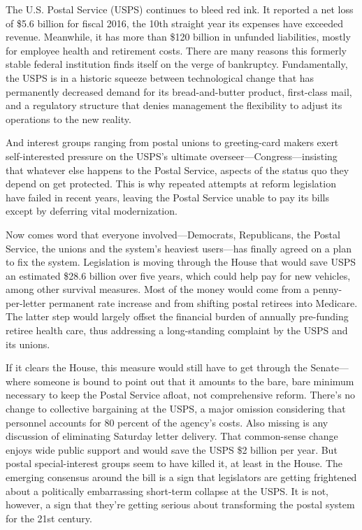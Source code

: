 The U.S. Postal Service (USPS) continues to bleed red ink. It reported
a net loss of \$5.6 billion for fiscal 2016, the 10th
straight year its expenses have exceeded revenue. Meanwhile, it has
more than \$120 billion in unfunded liabilities, mostly for employee
health and retirement costs. There are many reasons this formerly
stable federal institution finds itself on the verge of bankruptcy.
Fundamentally, the USPS is in a historic squeeze between technological
change that has permanently decreased demand for its bread-and-butter
product, first-class mail, and a regulatory structure that denies
management the flexibility to adjust its operations to the new reality.

And interest groups ranging from postal unions to greeting-card makers
exert self-interested pressure on the USPS's ultimate
overseer---Congress---insisting that whatever else happens to the Postal
Service, aspects of the status quo they depend on get protected. This
is why repeated attempts at reform legislation have failed in recent
years, leaving the Postal Service unable to pay its bills except by
deferring vital modernization.

Now comes word that everyone involved---Democrats, Republicans, the
Postal Service, the unions and the system's heaviest users---has finally
agreed on a plan to fix the system. Legislation is moving through the
House that would save USPS an estimated \$28.6 billion over five years,
which could help pay for new vehicles, among other survival measures.
Most of the money would come from a penny-per-letter permanent rate
increase and from shifting postal retirees into Medicare. The latter
step would largely offset the financial burden of annually pre-funding
retiree health care, thus addressing a long-standing complaint by the
USPS and its unions.

If it clears the House, this measure would still have to get through
the Senate---where someone is bound to point out that it amounts to the
bare, bare minimum necessary to keep the Postal Service afloat, not
comprehensive reform. There's no change to collective bargaining at the
USPS, a major omission considering that personnel accounts for 80
percent of the agency's costs. Also missing is any discussion of
eliminating Saturday letter delivery. That common-sense change enjoys
wide public support and would save the USPS \$2 billion per year. But
postal special-interest groups seem to have killed it, at least in the
House. The emerging consensus around the bill is a sign that
legislators are getting frightened about a politically embarrassing
short-term collapse at the USPS. It is not, however, a sign that
they're getting serious about transforming the postal system for the
21st century.

